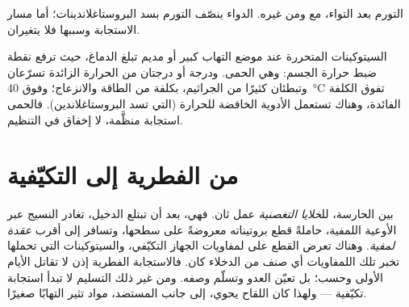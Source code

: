 \begin{omfigure}

{\small التورم بعد التواء، مع  ومن غيره. الدواء
ينصّف التورم بسد البروستاغلاندينات؛ أما مسار الاستجابة وسببها فلا
يتغيران.}
\end{omfigure}

\begin{example}[الحمى]\label{ex:g12:innate-immunity:fever}
السيتوكينات المتحررة عند موضع التهاب كبير أو مديم تبلغ الدماغ، حيث
ترفع نقطة ضبط حرارة الجسم: وهي الحمى. ودرجة أو درجتان من الحرارة
الزائدة تسرّعان  وتبطئان كثيرًا من الجراثيم، بكلفة من الطاقة
والانزعاج؛ وفوق \qty{40}{\celsius} تفوق الكلفة الفائدة، وهناك تستعمل
الأدوية الخافضة للحرارة (التي تسد البروستاغلاندين). فالحمى استجابة
منظَّمة، لا إخفاق في التنظيم.
\end{example}

\section{من الفطرية إلى التكيّفية}

\begin{proposition}[التسليم]\label{prop:g12:innate-immunity:handover}
بين  الحارسة، لل\emph{خلايا التغصنية} عمل
ثان. فهي، بعد أن تبتلع الدخيل، تغادر النسيج عبر الأوعية اللمفية،
حاملةً قطع بروتيناته معروضةً على سطحها، وتسافر إلى أقرب \emph{عقدة
لمفية}. وهناك تعرض القطع على لمفاويات الجهاز التكيّفي، والسيتوكينات
التي تحملها تخبر تلك اللمفاويات أي صنف من الدخلاء كان. فالاستجابة
الفطرية إذن لا تقاتل الأيام الأولى وحسب؛ بل تعيّن العدو وتسلّم وصفه.
ومن غير ذلك التسليم لا تبدأ استجابة تكيّفية --- ولهذا كان اللقاح يحوي،
إلى جانب المستضد، مواد تثير التهابًا صغيرًا.
\end{proposition}
\admitted

